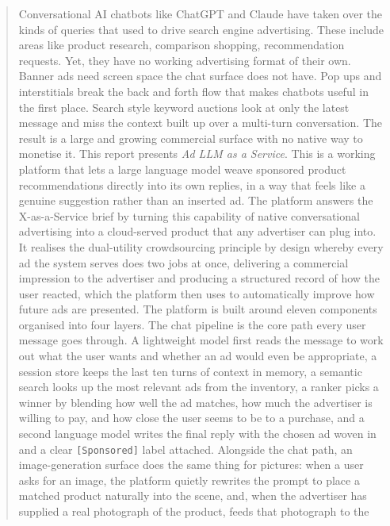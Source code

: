 \begin{abstract}
\noindent
Conversational AI chatbots like ChatGPT and Claude have taken over the kinds
of queries that used to drive search engine advertising. These include areas like product research,
comparison shopping, recommendation requests. Yet, they have no working
advertising format of their own. Banner ads need screen space the chat
surface does not have. Pop ups and interstitials break the back and forth
flow that makes chatbots useful in the first place. Search style keyword
auctions look at only the latest message and miss the context built up over
a multi-turn conversation. The result is a large and growing commercial
surface with no native way to monetise it.
\newline \newline
This report presents \emph{Ad LLM as a Service}. This is a working platform that
lets a large language model weave sponsored product recommendations directly
into its own replies, in a way that feels like a genuine suggestion rather
than an inserted ad. The platform answers the X-as-a-Service brief by
turning this capability of native conversational advertising into a
cloud-served product that any advertiser can plug into. It realises the
dual-utility crowdsourcing principle by design whereby every ad the system serves
does two jobs at once, delivering a commercial impression to the advertiser
and producing a structured record of how the user reacted, which the
platform then uses to automatically improve how future ads are presented.
\newline \newline
The platform is built around eleven components organised into four layers.
The chat pipeline is the core path every user message goes through. A
lightweight model first reads the message to work out what the user wants
and whether an ad would even be appropriate, a session store keeps the last
ten turns of context in memory, a semantic search looks up the most
relevant ads from the inventory, a ranker picks a winner by blending how
well the ad matches, how much the advertiser is willing to pay, and how
close the user seems to be to a purchase, and a second language model
writes the final reply with the chosen ad woven in and a clear
\texttt{[Sponsored]} label attached. Alongside the chat path, an
image-generation surface does the same thing for pictures: when a user
asks for an image, the platform quietly rewrites the prompt to place a
matched product naturally into the scene, and, when the advertiser has
supplied a real photograph of the product, feeds that photograph to the

\end{abstract}
